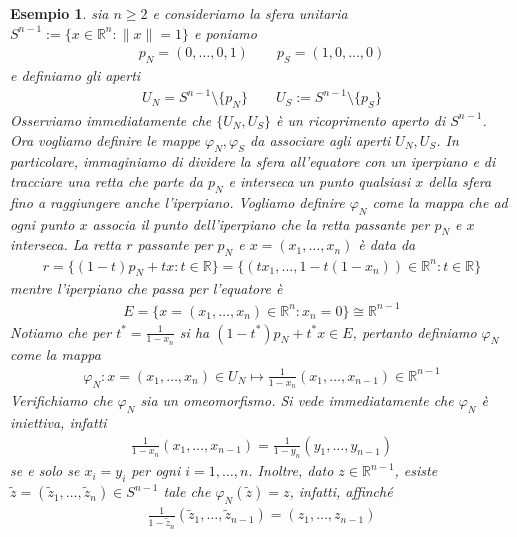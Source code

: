 \documentclass[oneside, 11pt]{amsbook}
\newcommand{\R}{\mathbb{R}}
\newcommand{\vp}{\varphi}
\newcommand{\wtz}{{\widetilde{z}}}
\newcommand{\0}{{(0)}}
\newcommand{\3}{{(3)}}
\theoremstyle{colonplain}
\theoremstyle{colondefinition}
\newtheorem{ex}[thm]{Esempio}
\theoremstyle{colonremark}
\numberwithin{equation}{chapter}
\begin{document}
\begin{ex}
    sia $n \geq 2$ e consideriamo la sfera unitaria $S^{n - 1} := \{x \in \R^n : \|x\| = 1\}$ e poniamo
    \begin{align}
        p_N = (0, \dots, 0, 1) \qquad p_S = (1, 0, \dots, 0)
    \end{align}
    e definiamo gli aperti
    \begin{align}
        U_N = S^{n - 1} \setminus \{p_N\} \qquad U_S := S^{n - 1} \setminus \{p_S\}
    \end{align}
    Osserviamo immediatamente che $\{U_N, U_S\}$ è un ricoprimento aperto di $S^{n - 1}$. \\
    Ora vogliamo definire le mappe $\vp_N, \vp_S$ da associare agli aperti $U_N, U_S$. In particolare, immaginiamo di dividere la sfera all'equatore con un iperpiano e di tracciare una retta che parte da $p_N$ e interseca un punto qualsiasi $x$ della sfera fino a raggiungere anche l'iperpiano. Vogliamo definire $\vp_N$ come la mappa che ad ogni punto $x$ associa il punto dell'iperpiano che la retta passante per $p_N$ e $x$ interseca. La retta $r$ passante per $p_N$ e $x = (x_1, \dots, x_n)$ è data da
    \begin{align}
        r = \{(1 - t)p_N + tx : t \in \mathbb{R}\} = \{(tx_1, \dots, 1 - t(1 - x_n)) \in \R^n : t \in \R\}
    \end{align}
    mentre l'iperpiano che passa per l'equatore è
    \begin{align}
        E = \{x = (x_1, \dots, x_n) \in \R^n : x_n = 0\} \cong \R^{n - 1}
    \end{align}
    Notiamo che per $t^* = \frac{1}{1 - x_n}$ si ha $(1 - t^*)p_N + t^*x \in E$, pertanto definiamo $\vp_N$ come la mappa
    \begin{align}
        \vp_N : x = (x_1, \dots, x_n) \in U_N \mapsto \frac{1}{1 - x_n}(x_1, \dots, x_{n - 1}) \in \R^{n - 1}
    \end{align}
    Verifichiamo che $\vp_N$ sia un omeomorfismo. Si vede immediatamente che $\vp_N$ è iniettiva, infatti
    \begin{align}
        \frac{1}{1 - x_n}(x_1, \dots, x_{n - 1}) = \frac{1}{1 - y_n}(y_1, \dots, y_{n - 1})
    \end{align}
    se e solo se $x_i = y_i$ per ogni $i = 1, \dots, n$. Inoltre, dato $z \in \R^{n - 1}$, esiste $\wtz = (\wtz_1, \dots, \wtz_n) \in S^{n - 1}$ tale che $\varphi_N(\wtz) = z$, infatti, affinché
    \begin{align}
        \frac{1}{1 - \wtz_n}(\wtz_1, \dots, \wtz_{n - 1}) = (z_1, \dots, z_{n - 1})

\end{align}
\end{ex}
\end{document}
